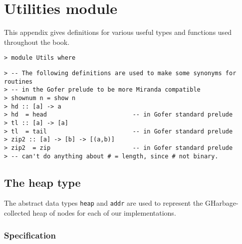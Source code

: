 \chapter{Utilities module}
\label{sect:utils}

This appendix gives definitions for various useful types and functions
used throughout the book.
\begin{verbatim}
> module Utils where
\end{verbatim}
%
\begin{verbatim}
> -- The following definitions are used to make some synonyms for routines
> -- in the Gofer prelude to be more Miranda compatible
> shownum n = show n
> hd :: [a] -> a
> hd  = head                        -- in Gofer standard prelude
> tl :: [a] -> [a]
> tl  = tail                        -- in Gofer standard prelude
> zip2 :: [a] -> [b] -> [(a,b)]
> zip2  = zip                       -- in Gofer standard prelude
> -- can't do anything about # = length, since # not binary.
\end{verbatim}
%
%
%
\section{The heap type}
\label{sect:heap}

The abstract data types \mbox{\tt heap} and \mbox{\tt addr} are used to represent the
GHarbage-collected heap of nodes
for each of our implementations.

\subsection{Specification}

